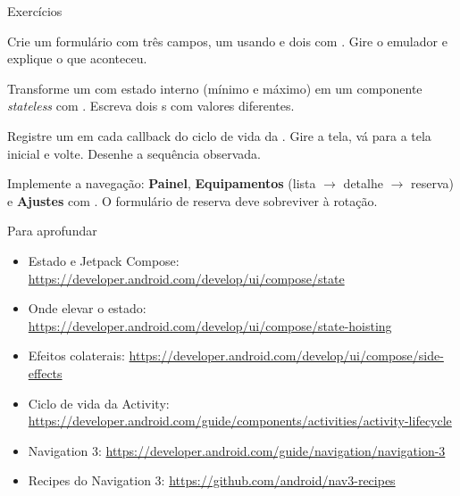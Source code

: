 \documentclass[aspectratio=169,10pt]{beamer}
\begin{document}
\begin{frame}{Exercícios}
  \begin{exercicio}
    Crie um formulário com três campos, um usando  e dois com . Gire o emulador e explique o que aconteceu.
  \end{exercicio}
  \begin{exercicio}
    Transforme um  com estado interno (mínimo e máximo) em um componente \emph{stateless} com . Escreva dois s com valores diferentes.
  \end{exercicio}
  \begin{exercicio}
    Registre um  em cada callback do ciclo de vida da . Gire a tela, vá para a tela inicial e volte. Desenhe a sequência observada.
  \end{exercicio}
  \begin{projeto}
    Implemente a navegação: \textbf{Painel}, \textbf{Equipamentos} (lista $\rightarrow$ detalhe $\rightarrow$ reserva) e \textbf{Ajustes} com . O formulário de reserva deve sobreviver à rotação.
  \end{projeto}
\end{frame}

\begin{frame}{Para aprofundar}
  \small
  \begin{itemize}
    \item Estado e Jetpack Compose: \url{https://developer.android.com/develop/ui/compose/state}
    \item Onde elevar o estado: \url{https://developer.android.com/develop/ui/compose/state-hoisting}
    \item Efeitos colaterais: \url{https://developer.android.com/develop/ui/compose/side-effects}
    \item Ciclo de vida da Activity: \url{https://developer.android.com/guide/components/activities/activity-lifecycle}
    \item Navigation 3: \url{https://developer.android.com/guide/navigation/navigation-3}
    \item Recipes do Navigation 3: \url{https://github.com/android/nav3-recipes}
  \end{itemize}
\end{frame}
\end{document}
